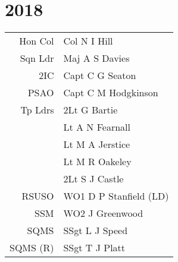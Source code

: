 \chapter*{2018}

\begin{center}
  \begin{tabular}{rl}
    Hon Col & Col N I Hill \\
    Sqn Ldr & Maj A S Davies \\
    2IC & Capt C G Seaton \\
    PSAO & Capt C M Hodgkinson \\
    Tp Ldrs & 2Lt G Bartie \\
     & Lt A N Fearnall \\
     & Lt M A Jerstice \\
     & Lt M R Oakeley \\
     & 2Lt S J Castle \\
    RSUSO & WO1 D P Stanfield (LD) \\
    SSM & WO2 J Greenwood \\
    SQMS & SSgt L J Speed \\
    SQMS (R) & SSgt T J Platt \\
  \end{tabular}
\end{center}

